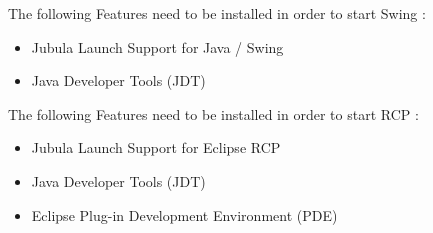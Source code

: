 The following Features need to be installed in order to start Swing \gdauts{}:
\begin{itemize}
\item{Jubula Launch Support for Java / Swing}
\item{Java Developer Tools (JDT)}
\end{itemize}

The following Features need to be installed in order to start RCP \gdauts{}:
\begin{itemize}
\item{Jubula Launch Support for Eclipse RCP}
\item{Java Developer Tools (JDT)}
\item{Eclipse Plug-in Development Environment (PDE)}
\end{itemize}
